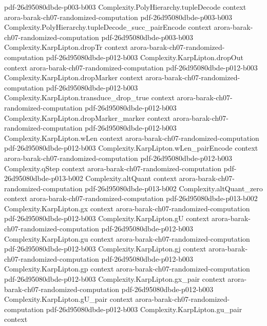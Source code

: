 \begin{theorem}
  {pdf-26d95080dbde-p003-b003}
\proofstep
  {Complexity.PolyHierarchy.tupleDecode}
  {context}
  {arora-barak-ch07-randomized-computation}
  {pdf-26d95080dbde-p003-b003}
\proofstep
  {Complexity.PolyHierarchy.tupleDecode_succ_pairEncode}
  {context}
  {arora-barak-ch07-randomized-computation}
  {pdf-26d95080dbde-p003-b003}
\proofstep
  {Complexity.KarpLipton.dropTr}
  {context}
  {arora-barak-ch07-randomized-computation}
  {pdf-26d95080dbde-p012-b003}
\proofstep
  {Complexity.KarpLipton.dropOut}
  {context}
  {arora-barak-ch07-randomized-computation}
  {pdf-26d95080dbde-p012-b003}
\proofstep
  {Complexity.KarpLipton.dropMarker}
  {context}
  {arora-barak-ch07-randomized-computation}
  {pdf-26d95080dbde-p012-b003}
\proofstep
  {Complexity.KarpLipton.transduce_drop_true}
  {context}
  {arora-barak-ch07-randomized-computation}
  {pdf-26d95080dbde-p012-b003}
\proofstep
  {Complexity.KarpLipton.dropMarker_marker}
  {context}
  {arora-barak-ch07-randomized-computation}
  {pdf-26d95080dbde-p012-b003}
\proofstep
  {Complexity.KarpLipton.wLen}
  {context}
  {arora-barak-ch07-randomized-computation}
  {pdf-26d95080dbde-p012-b003}
\proofstep
  {Complexity.KarpLipton.wLen_pairEncode}
  {context}
  {arora-barak-ch07-randomized-computation}
  {pdf-26d95080dbde-p012-b003}
\proofstep
  {Complexity.qStep}
  {context}
  {arora-barak-ch07-randomized-computation}
  {pdf-26d95080dbde-p013-b002}
\proofstep
  {Complexity.altQuant}
  {context}
  {arora-barak-ch07-randomized-computation}
  {pdf-26d95080dbde-p013-b002}
\proofstep
  {Complexity.altQuant_zero}
  {context}
  {arora-barak-ch07-randomized-computation}
  {pdf-26d95080dbde-p013-b002}
\proofstep
  {Complexity.KarpLipton.gx}
  {context}
  {arora-barak-ch07-randomized-computation}
  {pdf-26d95080dbde-p012-b003}
\proofstep
  {Complexity.KarpLipton.gU}
  {context}
  {arora-barak-ch07-randomized-computation}
  {pdf-26d95080dbde-p012-b003}
\proofstep
  {Complexity.KarpLipton.gu}
  {context}
  {arora-barak-ch07-randomized-computation}
  {pdf-26d95080dbde-p012-b003}
\proofstep
  {Complexity.KarpLipton.gj}
  {context}
  {arora-barak-ch07-randomized-computation}
  {pdf-26d95080dbde-p012-b003}
\proofstep
  {Complexity.KarpLipton.gp}
  {context}
  {arora-barak-ch07-randomized-computation}
  {pdf-26d95080dbde-p012-b003}
\proofstep
  {Complexity.KarpLipton.gx_pair}
  {context}
  {arora-barak-ch07-randomized-computation}
  {pdf-26d95080dbde-p012-b003}
\proofstep
  {Complexity.KarpLipton.gU_pair}
  {context}
  {arora-barak-ch07-randomized-computation}
  {pdf-26d95080dbde-p012-b003}
\proofstep
  {Complexity.KarpLipton.gu_pair}
  {context}

\end{theorem}
